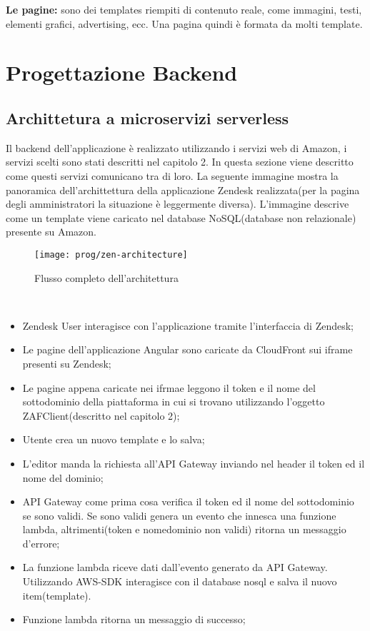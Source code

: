 \textbf{Le pagine:} sono dei templates riempiti di contenuto reale, come immagini, testi, elementi grafici, advertising, ecc. Una pagina quindi è formata da molti template. 
\newpage
\section{Progettazione Backend}
\subsection{Archittetura a microservizi serverless}
Il backend dell'applicazione è realizzato utilizzando i servizi web di Amazon, i servizi scelti sono stati descritti nel capitolo 2. In questa sezione viene descritto come questi servizi comunicano tra di loro. La seguente immagine mostra la panoramica dell'archittettura della applicazione Zendesk realizzata(per la pagina degli amministratori la situazione è leggermente diversa). L'immagine descrive come un template viene caricato nel database NoSQL(database non relazionale) presente su Amazon. 
\begin{figure}[!h] 
	\centering 
	\texttt{[image: prog/zen-architecture]} 
	\caption{Flusso completo dell'architettura}
\end{figure} 
\\
\begin{itemize}
	\item Zendesk User interagisce con l'applicazione tramite l'interfaccia di Zendesk;
	\item Le pagine dell'applicazione Angular sono caricate da CloudFront sui iframe presenti su Zendesk;
	\item Le pagine appena caricate nei ifrmae leggono il token e il nome del sottodominio della piattaforma in cui si trovano utilizzando l'oggetto ZAFClient(descritto nel capitolo 2);
	\item Utente crea un nuovo template e lo salva;
	\item L'editor manda la richiesta all'API Gateway inviando nel header il token ed il nome del dominio;
	\item API Gateway come prima cosa verifica il token ed il nome del sottodominio se sono validi. Se sono validi genera un evento che innesca una funzione lambda, altrimenti(token e nomedominio non validi) ritorna un messaggio d'errore;
	\item La funzione lambda riceve dati dall'evento generato da API Gateway. Utilizzando AWS-SDK interagisce con il database nosql e salva il nuovo item(template).
	\item Funzione lambda ritorna un messaggio di successo;
\end{itemize}
